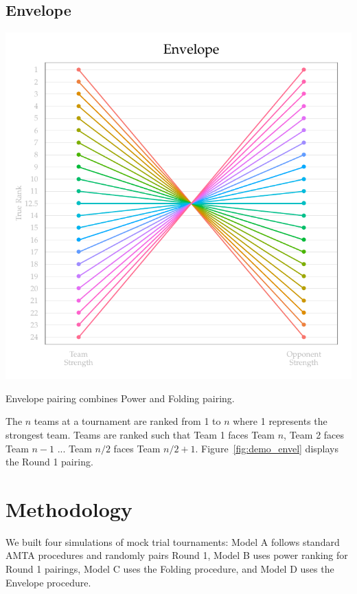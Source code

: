 \documentclass{tufte-handout}
\begin{document}
\subsection{Envelope}
\begin{marginfigure}%
  \includegraphics[width=\linewidth]{envelope_demo.pdf}
  \caption{Envelope pairing combines Power and Folding pairing.}
  \label{fig:demo_envel}
\end{marginfigure}
The $n$ teams at a tournament are ranked from 1 to $n$ where 1 represents the strongest team. Teams are ranked such that Team 1 faces Team $n$, Team 2 faces Team $n-1$ ... Team $n/2$ faces Team $n/2 + 1$. Figure~\ref{fig:demo_envel} displays the Round 1 pairing.

\section{Methodology}
We built four simulations of mock trial tournaments: Model A follows standard AMTA procedures and randomly pairs Round 1, Model B uses power ranking for Round 1 pairings, Model C uses the Folding procedure, and Model D uses the Envelope procedure.
\end{document}
